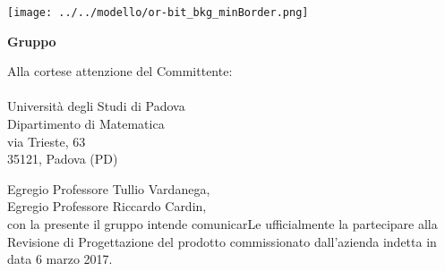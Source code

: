   
\begin{titlepage}
	
	\begin{center}
	 	
	\texttt{[image: ../../modello/or-bit\_bkg\_minBorder.png]} 
	\begin{Huge} 
	 	\textbf{Gruppo \GroupName{}}
	\end{Huge}
	\end{center}
	
	\vspace{0,5cm}
	\begin{large}
	\begin{flushright}
		Alla cortese attenzione del Committente: \\
		\Committente \\
		Università degli Studi di Padova \\
		Dipartimento di Matematica \\
		via Trieste, 63 \\
		35121, Padova (PD) 
		
		
	
	\end{flushright}

	\vspace{0,5cm}
	
	Egregio Professore Tullio Vardanega,\\
	Egregio Professore Riccardo Cardin, \\
	
	con la presente il gruppo \GroupName{} intende comunicarLe ufficialmente la partecipare alla Revisione di Progettazione del prodotto \ProjectName{} commissionato dall'azienda \Proponente{} indetta in data 6 marzo 2017.\\	
	

\end{large}
\end{titlepage}
